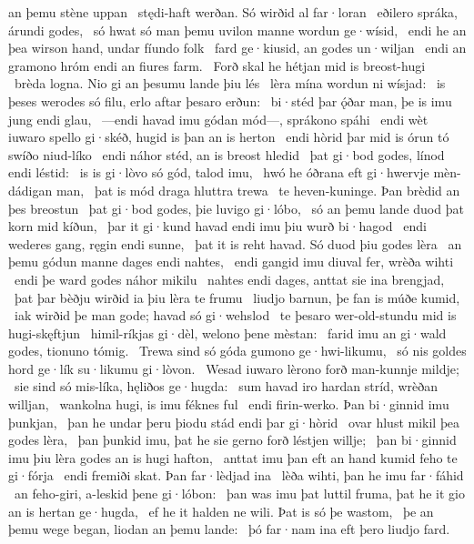 an þemu stène uppan \hld\ stędi-haft werðan.
Só wirðid al far·loran \hld\ eðilero spráka,
árundi godes, \hld\ só hwat só man þemu uvilon manne
wordun ge·wísid, \hld\ endi he an þea wirson hand,
undar fíundo folk \hld\ fard ge·kiusid,
an godes un·wiljan \hld\ endi an gramono hróm
endi an fiures farm. \hld\ Forð skal he hétjan
mid is breost-hugi \hld\ brèda logna.
Nio gi an þesumu lande þiu lés \hld\ lèra mína
wordun ni wísjad: \hld\ is þeses werodes só filu,
erlo aftar þesaro erðun: \hld\ bi·stéd þar ǫ́ðar man,
þe is imu jung endi glau, \hld\ —endi havad imu gódan mód—,
sprákono spáhi \hld\ endi wèt iuwaro spello gi·skéð,
hugid is þan an is herton \hld\ endi hòrid þar mid is órun tó
swíðo niud-líko \hld\ endi náhor stéd,
an is breost hledid \hld\ þat gi·bod godes,
línod endi léstid: \hld\ is is gi·lòvo só gód,
talod imu, \hld\ hwó he óðrana eft gi·hwervje
mèn-dádigan man, \hld\ þat is mód draga
hluttra trewa \hld\ te heven-kuninge.
Þan brèdid an þes breostun \hld\ þat gi·bod godes,
þie luvigo gi·lóbo, \hld\ só an þemu lande duod
þat korn mid kíðun, \hld\ þar it gi·kund havad
endi imu þiu wurð bi·hagod \hld\ endi wederes gang,
ręgin endi sunne, \hld\ þat it is reht havad.
Só duod þiu godes lèra \hld\ an þemu gódun manne
dages endi nahtes, \hld\ endi gangid imu diuval fer,
wrèða wihti \hld\ endi þe ward godes
náhor mikilu \hld\ nahtes endi dages,
anttat sie ina brengjad, \hld\ þat þar bèðju wirðid
ia þiu lèra te frumu \hld\ liudjo barnun,
þe fan is múðe kumid, \hld\ iak wirðid þe man gode;
havad só gi·wehslod \hld\ te þesaro wer-old-stundu
mid is hugi-skęftjun \hld\ himil-ríkjas gi·dèl,
welono þene mèstan: \hld\ farid imu an gi·wald godes,
tionuno tómig. \hld\ Trewa sind só góda
gumono ge·hwi-likumu, \hld\ só nis goldes hord
ge·lík su·likumu gi·lòvon. \hld\ Wesad iuwaro lèrono forð
man-kunnje mildje; \hld\ sie sind só mis-líka,
hęliðos ge·hugda: \hld\ sum havad iro hardan stríd,
wrèðan willjan, \hld\ wankolna hugi,
is imu féknes ful \hld\ endi firin-werko.
Þan bi·ginnid imu þunkjan, \hld\ þan he undar þeru þiodu stád
endi þar gi·hòrid \hld\ ovar hlust mikil
þea godes lèra, \hld\ þan þunkid imu, þat he sie gerno forð
léstjen willje; \hld\ þan bi·ginnid imu þiu lèra godes
an is hugi hafton, \hld\ anttat imu þan eft an hand kumid
feho te gi·fórja \hld\ endi fremiði skat.
Þan far·lèdjad ina \hld\ lèða wihti,
þan he imu far·fáhid \hld\ an feho-giri,
a-leskid þene gi·lóbon: \hld\ þan was imu þat luttil fruma,
þat he it gio an is hertan ge·hugda, \hld\ ef he it halden ne wili.
Þat is só þe wastom, \hld\ þe an þemu wege began,
liodan an þemu lande: \hld\ þó far·nam ina eft þero liudjo fard.
